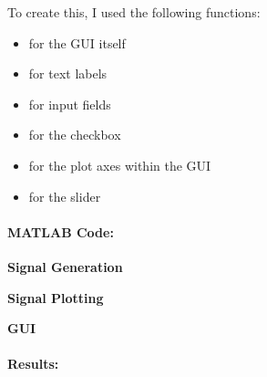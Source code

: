 To create this, I used the following functions:
\begin{itemize}
\item {} for the GUI itself
\item {} for text labels
\item {} for input fields
\item {} for the checkbox
\item {} for the plot axes within the GUI
\item {} for the slider
\end{itemize}

\paragraph{MATLAB Code:}

\textbf{Signal Generation}

\begin{tiny}

\end{tiny}

\textbf{Signal Plotting}

\begin{tiny}

\end{tiny}

\textbf{GUI}

\begin{tiny}

\end{tiny}

\paragraph{Results:}

